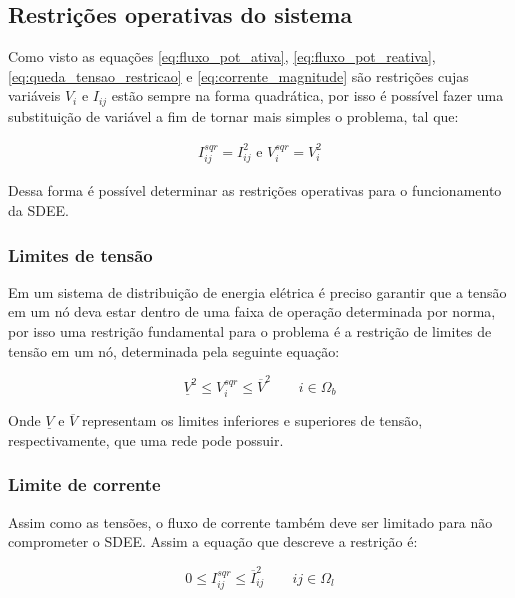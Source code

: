 \subsection{Restrições operativas do sistema}

Como visto as equações \ref{eq:fluxo_pot_ativa}, \ref{eq:fluxo_pot_reativa}, \ref{eq:queda_tensao_restricao} e \ref{eq:corrente_magnitude}
são restrições cujas variáveis $V_{i}$ e $I_{ij}$ estão sempre na forma quadrática, por isso é possível fazer uma substituição de variável a fim de tornar mais simples o problema, tal que:

\begin{align*}
    I_{ij}^{sqr} = I_{ij}^{2} \text{ e } V_{i}^{sqr} = V_{i}^{2} 
\end{align*}

Dessa forma é possível determinar as restrições operativas para o funcionamento da SDEE.

\subsubsection{Limites de tensão}

Em um sistema de distribuição de energia elétrica é preciso garantir que a tensão em um nó deva estar dentro de uma faixa de operação determinada por norma, por isso uma restrição fundamental para o problema é a restrição de limites de tensão em um nó, determinada pela seguinte equação:

\begin{equation}
    \underline{V}^{2} \leq V_{i}^{sqr} \leq \overline{V}^{2}\qquad i \in\Omega_{b}
\end{equation}

Onde $\underline{V}$ e $\overline{V}$ representam os limites inferiores e superiores de tensão, respectivamente, que uma rede pode possuir.



\subsubsection{Limite de corrente}

Assim como as tensões, o fluxo de corrente também deve ser limitado para não comprometer o SDEE.
Assim a equação que descreve a restrição é:

\begin{equation}
    0 \leq I_{ij}^{sqr} \leq \overline{I}_{ij}^{2} \qquad ij\in\Omega_{l} 
\end{equation}

